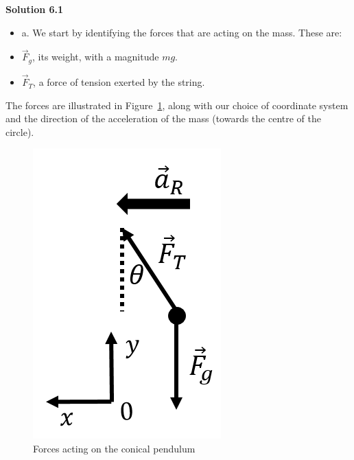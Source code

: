\begin{framed}
\textbf{Solution 6.1}\\
\begin{itemize}
\item a. We start by identifying the forces that are acting on the mass. These are:
\item $\vec F_g$, its weight, with a magnitude $mg$.
\item $\vec F_T$, a force of tension exerted by the string.
\end{itemize}

The forces are illustrated in Figure~\ref{fig:applyingnewtonslaws:conicalpendulumfbd}, along with our choice of coordinate system and the direction of the acceleration of the mass (towards the centre of the circle).

\begin{figure}[!htbp]
\centering
\includegraphics[width=0.2\linewidth]{files/conicalpendulumfbd-260518c853b0cc2419d64f256277bb48.png}
\caption[]{Forces acting on the conical pendulum}
\label{fig:applyingnewtonslaws:conicalpendulumfbd}
\end{figure}


\end{framed}
